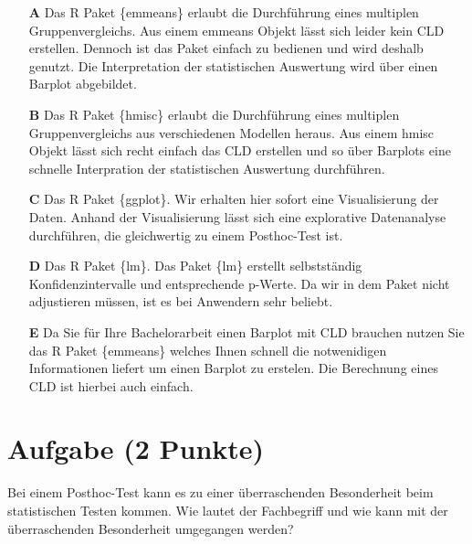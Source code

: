\documentclass[a4paper, 9pt]{scrartcl}\usepackage[]{graphicx}\usepackage[]{xcolor}
\begin{document}
\begin{enumerate}
\item [\textbf{A} \msquare] Das R Paket \{emmeans\} erlaubt die Durchführung eines multiplen Gruppenvergleichs. Aus einem emmeans Objekt lässt sich leider kein CLD erstellen. Dennoch ist das Paket einfach zu bedienen und wird deshalb genutzt. Die Interpretation der statistischen Auswertung wird über einen Barplot abgebildet.
\item [\textbf{B} \msquare] Das R Paket \{hmisc\} erlaubt die Durchführung eines multiplen Gruppenvergleichs aus verschiedenen Modellen heraus. Aus einem hmisc Objekt lässt sich recht einfach das CLD erstellen und so über Barplots eine schnelle Interpration der statistischen Auswertung durchführen.
\item [\textbf{C} \msquare] Das R Paket \{ggplot\}. Wir erhalten hier sofort eine Visualisierung der Daten. Anhand der Visualisierung lässt sich eine explorative Datenanalyse durchführen, die gleichwertig zu einem Posthoc-Test ist.
\item [\textbf{D} \msquare] Das R Paket \{lm\}. Das Paket \{lm\} erstellt selbstständig Konfidenzintervalle und entsprechende p-Werte. Da wir in dem Paket nicht adjustieren müssen, ist es bei Anwendern sehr beliebt.
\item [\textbf{E} \msquare] Da Sie für Ihre Bachelorarbeit einen Barplot mit CLD brauchen nutzen Sie das R Paket \{emmeans\} welches Ihnen schnell die notwenidigen Informationen liefert um einen Barplot zu erstelen. Die Berechnung eines CLD ist hierbei auch einfach.
\end{enumerate}

\section{Aufgabe \hfill (2 Punkte)}



Bei einem Posthoc-Test kann es zu einer überraschenden Besonderheit beim statistischen Testen kommen. Wie lautet der Fachbegriff und wie kann mit der überraschenden Besonderheit umgegangen werden?
\end{document}
